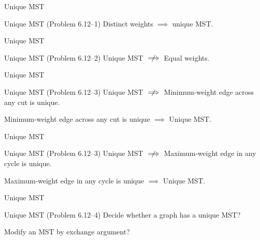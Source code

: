 \begin{frame}{Unique MST}
  \begin{exampleblock}{Unique MST (Problem 6.12--1)}
    Distinct weights $\implies$ unique MST.
  \end{exampleblock}
\end{frame}
\begin{frame}{Unique MST}
  \begin{exampleblock}{Unique MST (Problem 6.12--2)}
	Unique MST $\centernot\implies$ Equal weights.
  \end{exampleblock}

\end{frame}
\begin{frame}{Unique MST}
  \begin{exampleblock}{Unique MST (Problem 6.12--3)}
	Unique MST $\centernot\implies$ Minimum-weight edge across any cut is unique.
  \end{exampleblock}


  \begin{theorem}
    Minimum-weight edge across any cut is unique $\implies$ Unique MST.
  \end{theorem}
\end{frame}
\begin{frame}{Unique MST}
  \begin{exampleblock}{Unique MST (Problem 6.12--3)}
    Unique MST $\centernot\implies$ Maximum-weight edge in any cycle is unique.
  \end{exampleblock}


  \begin{theorem}[Conjecture]
	Maximum-weight edge in any cycle is unique $\implies$ Unique MST.
  \end{theorem}
\end{frame}
\begin{frame}{Unique MST}
  \begin{exampleblock}{Unique MST (Problem 6.12--4)}
	Decide whether a graph has a unique MST?
  \end{exampleblock}

  \vspace{0.60cm}
  \centerline{Modify an MST by exchange argument?}
\end{frame}
